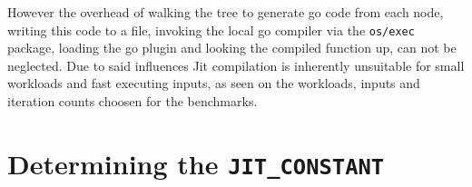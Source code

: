 However the overhead of walking the tree to generate go code from each node,
writing this code to a file, invoking the local go compiler via the
\texttt{os/exec} package, loading the go plugin and looking the compiled
function up, can not be neglected. Due to said influences Jit compilation
is inherently unsuitable for small workloads and fast executing inputs, as seen
on the workloads, inputs and iteration counts choosen for the benchmarks. 

\section{Determining the \texttt{JIT\_CONSTANT}}
\label{sec:jit-constant-discussion}
